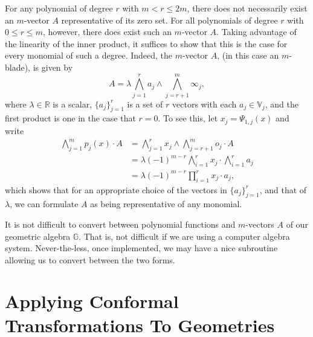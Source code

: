\documentclass{ecgd-l}
\theoremstyle{definition}
\theoremstyle{remark}
\numberwithin{equation}{section}
\newcommand{\G}{\mathbb{G}}
\newcommand{\V}{\mathbb{V}}
\newcommand{\R}{\mathbb{R}}
\newcommand{\nvai}{\infty}
\newcommand{\nvao}{o}
\begin{document}
For any polynomial of degree $r$ with $m<r\leq 2m$, there does not necessarily exist an $m$-vector
$A$ representative of its zero set.  For all polynomials of degree $r$ with $0\leq r\leq m$, however,
there does exist such an $m$-vector $A$.  Taking advantage of the linearity of the inner product,
it suffices to show that this is the case for every monomial of such a degree.  Indeed, the $m$-vector
$A$, (in this case an $m$-blade), is given by
\begin{equation*}
A = \lambda\bigwedge_{j=1}^r a_j\wedge\bigwedge_{j=r+1}^m\nvai_j,
\end{equation*}
where $\lambda\in\R$ is a scalar, $\{a_j\}_{j=1}^r$ is a set of $r$ vectors with
each $a_j\in\V_j$,
and the first product is one in the case that $r=0$.
To see this, let $x_j=\Psi_{1,j}(x)$ and write
\begin{align*}
\bigwedge_{j=1}^m p_j(x)\cdot A &= \bigwedge_{j=1}^r x_j\wedge\bigwedge_{j=r+1}^m\nvao_j\cdot A \\
 &= \lambda(-1)^{m-r}\bigwedge_{i=1}^r x_j \cdot\bigwedge_{i=1}^r a_j \\
 &= \lambda(-1)^{m-r}\prod_{i=1}^r x_j\cdot a_j,
\end{align*}
which shows that for an appropriate choice of the vectors in $\{a_j\}_{j=1}^r$,
and that of $\lambda$, we can formulate $A$ as being representative of any monomial.

It is not difficult to convert between polynomial functions and $m$-vectors $A$
of our geometric algebra $\G$.  That is, not difficult if we are using a computer
algebra system.  Never-the-less, once implemented, we may have a nice subroutine
allowing us to convert between the two forms.

\section{Applying Conformal Transformations To Geometries}
\end{document}
